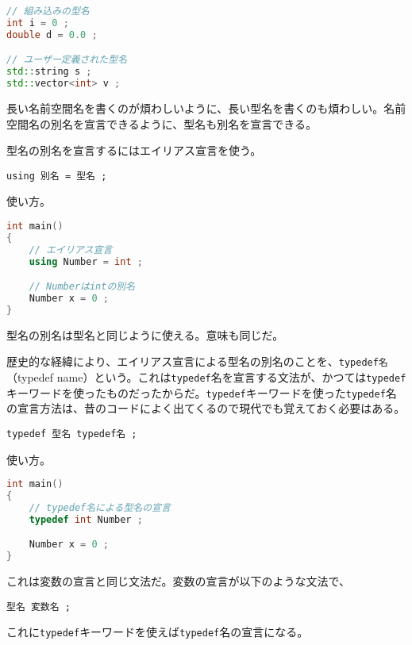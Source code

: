 \begin{lstlisting}[language={C++}]
// 組み込みの型名
int i = 0 ;
double d = 0.0 ;

// ユーザー定義された型名
std::string s ;
std::vector<int> v ;
\end{lstlisting}


長い名前空間名を書くのが煩わしいように、長い型名を書くのも煩わしい。名前空間名の別名を宣言できるように、型名も別名を宣言できる。

型名の別名を宣言するにはエイリアス宣言を使う。

\begin{lstlisting}[style=grammar]
using 別名 = 型名 ;
\end{lstlisting}

\ifTombow\pagebreak\fi
使い方。

\begin{lstlisting}[language={C++}]
int main()
{
    // エイリアス宣言
    using Number = int ;

    // Numberはintの別名
    Number x = 0 ;
}
\end{lstlisting}

型名の別名は型名と同じように使える。意味も同じだ。

歴史的な経緯により、エイリアス宣言による型名の別名のことを、\texttt{typedef名}（typedef name）という。これは\texttt{typedef}名を宣言する文法が、かつては\texttt{typedef}キーワードを使ったものだったからだ。\texttt{typedef}キーワードを使った\texttt{typedef}名の宣言方法は、昔のコードによく出てくるので現代でも覚えておく必要はある。

\begin{lstlisting}[style=grammar]
typedef 型名 typedef名 ;
\end{lstlisting}

使い方。

\begin{lstlisting}[language={C++}]
int main()
{
    // typedef名による型名の宣言
    typedef int Number ;

    Number x = 0 ;
}
\end{lstlisting}

これは変数の宣言と同じ文法だ。変数の宣言が以下のような文法で、
\begin{lstlisting}[style=grammar]
型名 変数名 ;
\end{lstlisting}
これに\texttt{typedef}キーワードを使えば\texttt{typedef}名の宣言になる。

